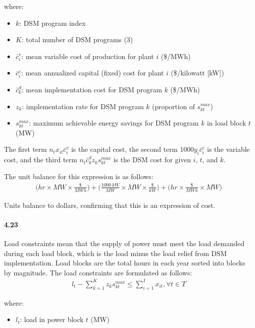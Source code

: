 \documentclass{article}
\begin{document}
	where:
	\begin{itemize}
		\item $k$: DSM program index
		\item $K$: total number of DSM programs (3)
		\item $\bar{c}_i^v$: mean variable cost of production for plant $i$ (\$/MWh)
		\item $\bar{c}_i^c$: mean annualized capital (fixed) cost for plant $i$ (\$/kilowatt [kW])
		\item $\bar{c}_k^d$: mean implementation cost for DSM program $k$ (\$/MWh)
		\item $z_k$: implementation rate for DSM program $k$ (proportion of $s_{kt}^{max}$)
		\item $s_{kt}^{max}$: maximum achievable energy savings for DSM program $k$ in load block $t$ (MW)
	\end{itemize}
	
	The first term $n_t x_{it} \bar{c}_i^v$ is the capital cost, the second term $1000y_i \bar{c}_i^c$ is the variable cost, and the third term $n_t \bar{c}_k^d z_k s_{kt}^{max}$ is the DSM cost for given $i$, $t$, and $k$.
	
	The unit balance for this expression is as follows:
	\begin{align*}
		\big( hr \times MW \times \frac{\$}{MWh} \big) + 
		\big( \frac{1000 \  kW}{MW} \times MW \times \frac{\$}{kW} \big) +
		\big( hr \times \frac{\$}{MWh} \times MW \big)
	\end{align*}
	
	Units balance to dollars, confirming that this is an expression of cost.
 	

\paragraph{4.23}
	Load constraints mean that the supply of power must meet the load demanded during each load block, which is the load minus the load relief from DSM implementation. Load blocks are the total hours in each year sorted into blocks by magnitude. The load constraints are formulated as follows:
	\begin{align*}
		l_t - \sum_{k=1}^{K} z_k s_{kt}^{max} \leq \sum_{i=1}^{I} x_{it}, \forall t \in T
	\end{align*}
	
	where:
	\begin{itemize}
		\item $l_t$: load in power block $t$ (MW)
	\end{itemize}
	
\end{document}
